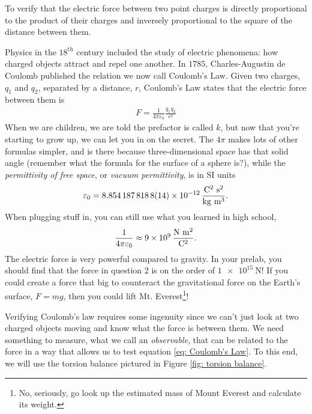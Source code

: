 \documentclass[addpoints]{physlabs}
\begin{document}
\begin{labsection}

\begin{objective}
    To verify that the electric force between two point charges is directly proportional to the product of their charges and inversely proportional to the square of the distance between them.
\end{objective}

\begin{theory}
    \par Physics in the $18^\text{th}$ century included the study of electric phenomena: how charged objects attract and repel one another.
    In $1785$, Charles-Augustin de Coulomb published the relation we now call Coulomb's Law.
    Given two charges, $q_1$ and $q_2$, separated by a distance, $r$, Coulomb's Law states that the electric force between them is
    \begin{align}\label{eq: Coulomb's Law}
        F = \frac{1}{4\pi\varepsilon_0}\frac{q_1 q_2}{r^2}
    \end{align}
    When we are children, we are told the prefactor is called $k$, but now that you're starting to grow up, we can let you in on the secret.
    The $4\pi$ makes lots of other formulas simpler, and is there because three-dimensional space has that solid angle (remember what the formula for the surface of a sphere is?), while the \textsl{permittivity of free space}, or \textsl{vacuum permittivity}, is in SI units
    \begin{align*}
        \varepsilon_0 = \qty{8.8541878188(14)e-12}{\frac{\coulomb^2\ \second^2}{\kilo\gram\ \meter^3}}.
    \end{align*}
    When plugging stuff in, you can still use what you learned in high school,
    \begin{align*}
        \frac{1}{4\pi\varepsilon_0}\approx \qty{9e9}{\frac{\newton\ \meter^2}{\coulomb^2}}.
    \end{align*}
    The electric force is very powerful compared to gravity.
    In your prelab, you should find that the force in question 2 is on the order of $\qty{1e15}{\newton}$!
    If you could create a force that big to counteract the gravitational force on the Earth's surface, $F=mg$, then you could lift Mt. Everest\footnote{No, seriously, go look up the estimated mass of Mount Everest and calculate its weight.}!

    Verifying Coulomb's law requires some ingenuity since we can't just look at two charged objects moving and know what the force is between them.
    We need something to measure, what we call an \textit{observable}, that can be related to the force in a way that allows us to test equation \ref{eq: Coulomb's Law}.
    To this end, we will use the torsion balance pictured in Figure \ref{fig: torsion balance}.


\end{theory}
\end{labsection}
\end{document}
